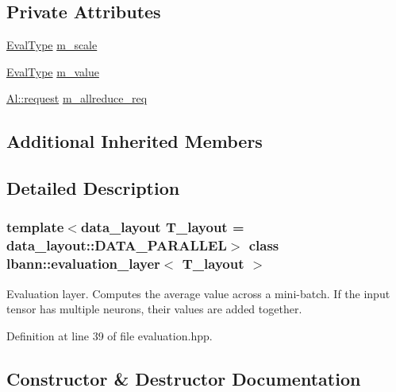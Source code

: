 \subsection*{Private Attributes}
\begin{DoxyCompactItemize}
\item 
\hyperlink{base_8hpp_a3266f5ac18504bbadea983c109566867}{Eval\+Type} \hyperlink{classlbann_1_1evaluation__layer_af365bda5700dca43434b01f0a2b1ee45}{m\+\_\+scale}
\item 
\hyperlink{base_8hpp_a3266f5ac18504bbadea983c109566867}{Eval\+Type} \hyperlink{classlbann_1_1evaluation__layer_a0d45f7694e2778f0a0dfb49212f37aef}{m\+\_\+value}
\item 
\hyperlink{structlbann_1_1Al_1_1request}{Al\+::request} \hyperlink{classlbann_1_1evaluation__layer_a3f2143da6cab67a7e1407a73116a2469}{m\+\_\+allreduce\+\_\+req}
\end{DoxyCompactItemize}
\subsection*{Additional Inherited Members}


\subsection{Detailed Description}
\subsubsection*{template$<$data\+\_\+layout T\+\_\+layout = data\+\_\+layout\+::\+D\+A\+T\+A\+\_\+\+P\+A\+R\+A\+L\+L\+EL$>$\newline
class lbann\+::evaluation\+\_\+layer$<$ T\+\_\+layout $>$}

Evaluation layer. Computes the average value across a mini-\/batch. If the input tensor has multiple neurons, their values are added together. 

Definition at line 39 of file evaluation.\+hpp.



\subsection{Constructor \& Destructor Documentation}
\mbox{\label{classlbann_1_1evaluation__layer_a55aea0fdd91154eccbbd8a1e6a8ce5e3}} 
